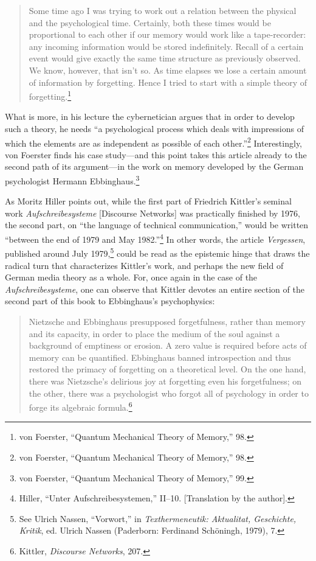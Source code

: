 \documentclass{tufte-handout}
\begin{document}
\begin{quote}
Some time ago I was trying to work out a relation between the physical
and the psychological time. Certainly, both these times would be
proportional to each other if our memory would work like a
tape-recorder: any incoming information would be stored indefinitely.
Recall of a certain event would give exactly the same time structure as
previously observed. We know, however, that isn't so. As time elapses we
lose a certain amount of information by forgetting. Hence I tried to
start with a simple theory of forgetting.\footnote{von Foerster,
  ``Quantum Mechanical Theory of Memory,'' 98.}
\end{quote}

\noindent What is more, in his lecture the cybernetician argues that in order to
develop such a theory, he needs ``a psychological process which deals
with impressions of which the elements are as independent as possible of
each other.''\footnote{von Foerster, ``Quantum Mechanical Theory of
  Memory,'' 98.} Interestingly, von Foerster finds his case study---and
this point takes this article already to the second path of its
argument---in the work on memory developed by the German psychologist
Hermann Ebbinghaus.\footnote{von Foerster, ``Quantum Mechanical Theory
  of Memory,'' 99.}

As Moritz Hiller points out, while the first part of Friedrich Kittler's
seminal work \emph{Aufschreibesysteme} {[}Discourse Networks{]} was
practically finished by 1976, the second part, on ``the language of
technical communication,'' would be written ``between the end of 1979
and May 1982.''\footnote{Hiller, ``Unter Aufschreibesystemen,'' II--10.
  {[}Translation by the author{]}.} In other words, the article
\emph{Vergessen}, published around July 1979,\footnote{See Ulrich
  Nassen, ``Vorwort,'' in \emph{Texthermeneutik: Aktualitat, Geschichte,
  Kritik}, ed. Ulrich Nassen (Paderborn: Ferdinand Schöningh, 1979), 7.}
could be read as the epistemic hinge that draws the radical turn that
characterizes Kittler's work, and perhaps the new field of German media
theory as a whole. For, once again in the case of the
\emph{Aufschreibesysteme}, one can observe that Kittler devotes an
entire section of the second part of this book to Ebbinghaus's
psychophysics:

\begin{quote}
Nietzsche and Ebbinghaus presupposed forgetfulness, rather than memory
and its capacity, in order to place the medium of the soul against a
background of emptiness or erosion. A zero value is required before acts
of memory can be quantified. Ebbinghaus banned introspection and thus
restored the primacy of forgetting on a theoretical level. On the one
hand, there was Nietzsche's delirious joy at forgetting even his
forgetfulness; on the other, there was a psychologist who forgot all of
psychology in order to forge its algebraic formula.\footnote{Kittler,
  \emph{Discourse Networks}, 207.}
\end{quote}
\end{document}
